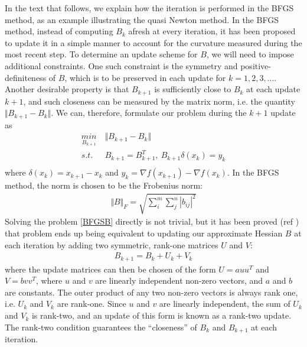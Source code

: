 \documentclass  [
  paper    = a4,
  BCOR     = 10mm,
  twoside,
  fontsize = 12pt,
  fleqn,
  toc      = bibnumbered,
  toc      = listofnumbered,
  numbers  = noendperiod,
  headings = normal,
  listof   = leveldown,
  version  = 3.03
]                                       {scrreprt}
\newcommand{\<}{\langle}
\renewcommand{\>}{\rangle}
\begin{document}
In the text that follows, we explain how the iteration is performed in the BFGS method, as an example illustrating the quasi Newton method. In the BFGS method, instead of computing $B_k$ afresh at every iteration, it has been proposed to update it in a simple manner to account for the curvature measured during the most recent step. To determine an update scheme for $B$, we will need to impose additional constraints. One such constraint is the symmetry and positive-definiteness of $B$, which is to be preserved in each update for $k = 1,2, 3, ...$. Another desirable property is that $B_{k+1}$ is sufficiently close to $B_k$ at each update $k+1$, and such closeness can be measured by the matrix norm, i.e. the quantity $\Vert B_{k+1} - B_{k} \Vert$. We can, therefore, formulate our problem during the $k+1$ update as 
\begin{equation}
	\begin{aligned}
		\underset{B_{k+1}}{min} \  &  \Vert B_{k+1} - B_{k} \Vert\\
		s.t.\ \  & B_{k+1}= B_{k+1}^T, \ B_{k+1}\delta(x_k)  = y_k \\
	\end{aligned}
	\label{BFGSB}
\end{equation}
where $\delta(x_k) = x_{k+1} -x_k$ and $y_k = \nabla f(x_{k+1}) - \nabla f(x_k)$. In the BFGS method, the norm is chosen to be the Frobenius norm:
\begin{align*}
	\Vert B \Vert_F = \sqrt{\sum_{i}^{m} \sum_{j}^{n} |b_{ij}|^2} 
\end{align*}
Solving the problem \ref{BFGSB} directly is not trivial, but it has been proved (ref \cite{JorSte06}) that problem ends up being equivalent to updating our approximate Hessian $B$ at each iteration by adding two symmetric, rank-one matrices $U$ and $V$:
\begin{align*}
	B_{k+1} = B_k + U_k + V_k
\end{align*}
where the update matrices can then be chosen of the form $U = a u u^T$ and $V = b v v^T$, where $u$ and $v$ are linearly independent non-zero vectors, and $a$ and $b$ are constants.  The outer product of any two non-zero vectors is always rank one, i.e. $U_k$ and $V_k$ are rank-one. Since $u$ and $v$ are linearly independent, the sum of $U_k$ and $V_k$ is rank-two, and an update of this form is known as a rank-two update. The rank-two condition guarantees the “closeness” of $B_k$ and $B_{k+1}$ at each iteration. 
\end{document}
